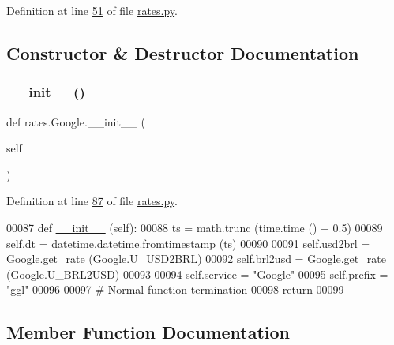 Definition at line \hyperlink{rates_8py_source_l00051}{51} of file \hyperlink{rates_8py_source}{rates.\+py}.



\subsection{Constructor \& Destructor Documentation}
\mbox{\label{classrates_1_1_google_a6d9d023db3b4f6f2b585397e3469c396}} 
\subsubsection{\texorpdfstring{\+\_\+\+\_\+init\+\_\+\+\_\+()}{\_\_init\_\_()}}
{\footnotesize\ttfamily def rates.\+Google.\+\_\+\+\_\+init\+\_\+\+\_\+ (\begin{DoxyParamCaption}\item[{}]{self }\end{DoxyParamCaption})}



Definition at line \hyperlink{rates_8py_source_l00087}{87} of file \hyperlink{rates_8py_source}{rates.\+py}.


\begin{DoxyCode}
00087     \textcolor{keyword}{def }\hyperlink{namespacestart__time_a9c9bd378729a13c96a22c8b079ea172c}{\_\_init\_\_} (self):
00088         ts = math.trunc (time.time () + 0.5)
00089         self.dt = datetime.datetime.fromtimestamp (ts)
00090                 
00091         self.usd2brl = Google.get\_rate (Google.U\_USD2BRL)
00092         self.brl2usd = Google.get\_rate (Google.U\_BRL2USD)
00093                 
00094         self.service = \textcolor{stringliteral}{"Google"}
00095         self.prefix = \textcolor{stringliteral}{"ggl"}
00096                 
00097         \textcolor{comment}{# Normal function termination}
00098         \textcolor{keywordflow}{return}
00099             
\end{DoxyCode}


\subsection{Member Function Documentation}
\mbox{\label{classrates_1_1_google_afa49252959b89741449dca773f2141b8}} 

